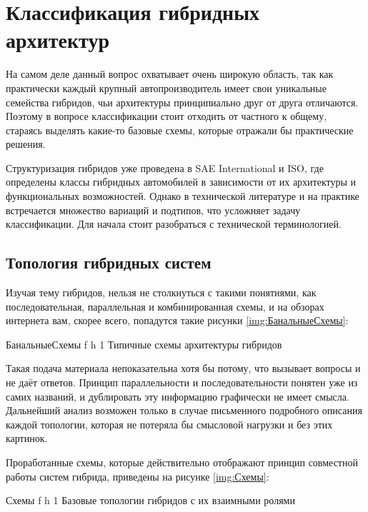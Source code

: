\chapter{Классификация гибридных архитектур}

На самом деле данный вопрос охватывает очень широкую область, так как практически каждый крупный автопроизводитель имеет свои уникальные семейства гибридов, чьи архитектуры принципиально друг от друга отличаются. Поэтому в вопросе классификации стоит отходить от частного к общему, стараясь выделять какие-то базовые схемы, которые отражали бы практические решения.

Структуризация гибридов уже проведена в SAE International и ISO, где определены классы гибридных автомобилей в зависимости от их архитектуры и функциональных возможностей. Однако в технической литературе и на практике встречается множество вариаций и подтипов, что усложняет задачу классификации. Для начала стоит разобраться с технической терминологией.

\section{Топология гибридных систем}

Изучая тему гибридов, нельзя не столкнуться с такими понятиями, как последовательная, параллельная и комбинированная схемы, и на обзорах интернета вам, скорее всего, попадутся такие рисунки \ref{img:БанальныеСхемы}:

    {БанальныеСхемы} %
    {f} %
    {h} %
    {1\textwidth} %
    {Типичные схемы архитектуры гибридов} %

Такая подача материала непоказательна хотя бы потому, что вызывает вопросы и не даёт ответов.  Принцип параллельности и последовательности понятен уже из самих названий, и дублировать эту информацию графически не имеет смысла. Дальнейший анализ возможен только в случае письменного подробного описания каждой топологии, которая не потеряла бы смысловой нагрузки и без этих картинок.

\newpage

Проработанные схемы, которые действительно отображают принцип совместной работы систем гибрида, приведены на рисунке \ref{img:Схемы}:

    {Схемы} %
    {f} %
    {h} %
    {1\textwidth} %
    {Базовые топологии гибридов с их взаимными ролями} %


